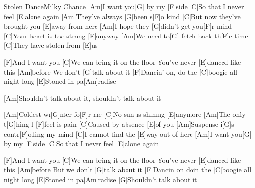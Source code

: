 \documentclass[../main.tex]{subfiles}
\begin{document}
\begin{song}{Stolen Dance}{Milky Chance}{}
[Am]I want you[G] by my [F]side
[C]So that I never feel [E]alone again
[Am]They've always [G]been s[F]o kind
[C]But now they've brought you [E]away from here
[Am]I hope they [G]didn't get you[F]r mind
[C]Your heart is too strong [E]anyway
[Am]We need to[G] fetch back th[F]e time
[C]They have stolen from [E]us

[F]And I want you
[C]We can bring it on the floor
You've never [E]danced like this [Am]before
We don't [G]talk about it
[F]Dancin' on, do the [C]boogie all night long
[E]Stoned in pa[Am]radise

[Am]Shouldn't talk about it, shouldn't talk about it

[Am]Coldest wi[G]nter fo[F]r me
[C]No sun is shining [E]anymore
[Am]The only t[G]hing I [F]feel is pain
[C]Caused by absence [E]of you
[Am]Suspense i[G]s contr[F]olling my mind
[C]I cannot find the [E]way out of here
[Am]I want you[G] by my [F]side
[C]So that I never feel [E]alone again

[F]And I want you
[C]We can bring it on the floor
You've never [E]danced like this [Am]before
But we don't [G]talk about it
[F]Dancin on doin the [C]boogie all night long
[E]Stoned in pa[Am]radise
[G]Shouldn't talk about it
\end{song}
\end{document}
